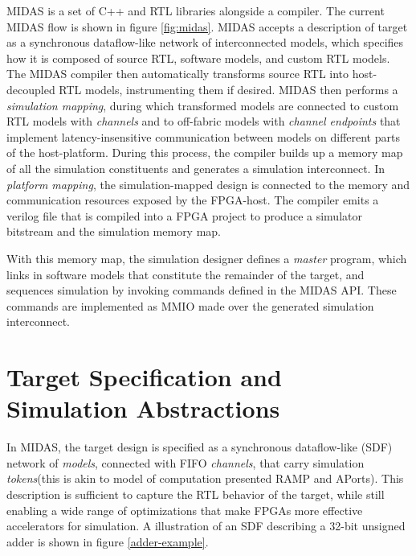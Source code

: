 MIDAS is a set of C++ and RTL libraries alongside a compiler. The current MIDAS
flow is shown in figure \ref{fig:midas}. MIDAS accepts a description of target
as a synchronous dataflow-like network of interconnected models, which
specifies how it is composed of source RTL, software models, and custom RTL
models. The MIDAS compiler then automatically transforms source RTL into
host-decoupled RTL models, instrumenting them if desired. MIDAS then performs a
\emph{simulation mapping}, during which transformed models are connected to
custom RTL models with \emph{channels} and to off-fabric models with
\textit{channel endpoints} that implement latency-insensitive communication
between models on different parts of the host-platform. During this process,
the compiler builds up a memory map of all the simulation constituents and
generates a simulation interconnect. In \emph{platform mapping}, the
simulation-mapped design is connected to the memory and communication resources
exposed by the FPGA-host. The compiler emits a verilog file that is compiled
into a FPGA project to produce a simulator bitstream and the simulation memory
map.

With this memory map, the simulation designer defines a \emph{master} program,
which links in software models that constitute the remainder of the target, and
sequences simulation by invoking commands defined in the MIDAS API. These
commands are implemented as MMIO made over the generated simulation
interconnect.

\section{Target Specification and Simulation Abstractions}\label{sec:sdf}

In MIDAS, the target design is specified as a synchronous dataflow-like (SDF)
network of \emph{models}, connected with FIFO \emph{channels}, that carry
simulation \emph{tokens}(this is akin to model of computation presented
RAMP\cite{ramp} and APorts\cite{APortNetworks}). This description is sufficient
to capture the RTL behavior of the target, while still enabling a wide range of
optimizations that make FPGAs more effective accelerators for simulation.  A
illustration of an SDF describing a 32-bit unsigned adder is shown in figure
\ref{adder-example}.

